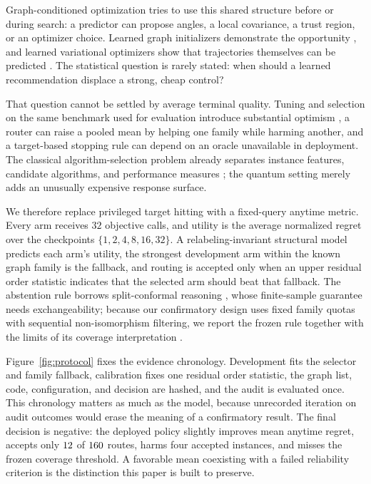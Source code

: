 \documentclass[10pt,twocolumn]{article}
\newcounter{algorithm}
\begin{document}
Graph-conditioned optimization tries to use this shared structure before or
during search: a predictor can propose angles, a local covariance, a trust
region, or an optimizer choice.  Learned graph initializers demonstrate the
opportunity \citep{jain2022gnn}, and learned variational optimizers show that
trajectories themselves can be predicted \citep{khairy2020learning}.  The
statistical question is rarely stated: when should a learned recommendation
displace a strong, cheap control?

That question cannot be settled by average terminal quality.  Tuning and
selection on the same benchmark used for evaluation introduce substantial
optimism \citep{cawley2010overfitting}, a router can raise a pooled mean by
helping one family while harming another, and a target-based stopping rule can
depend on an oracle unavailable in deployment.  The classical algorithm-selection
problem already separates instance features, candidate algorithms, and
performance measures \citep{rice1976selection}; the quantum setting merely adds
an unusually expensive response surface.

We therefore replace privileged target hitting with a fixed-query anytime
metric.  Every arm receives $32$ objective calls, and utility is the average
normalized regret over the checkpoints $\{1,2,4,8,16,32\}$.  A
relabeling-invariant structural model predicts each arm's utility, the strongest
development arm within the known graph family is the fallback, and routing is
accepted only when an upper residual order statistic indicates that the selected
arm should beat that fallback.  The abstention rule borrows split-conformal
reasoning \citep{vovk2005algorithmic,angelopoulos2021gentle}, whose finite-sample
guarantee needs exchangeability; because our confirmatory design uses fixed
family quotas with sequential non-isomorphism filtering, we report the frozen
rule together with the limits of its coverage interpretation
\citep{barber2022exchangeability}.

Figure~\ref{fig:protocol} fixes the evidence chronology.  Development fits the
selector and family fallback, calibration fixes one residual order statistic, the
graph list, code, configuration, and decision are hashed, and the audit is
evaluated once.  This chronology matters as much as the model, because
unrecorded iteration on audit outcomes would erase the meaning of a confirmatory
result.  The final decision is negative: the deployed policy slightly improves
mean anytime regret, accepts only $12$ of $160$ routes,
harms four accepted instances, and misses the frozen coverage threshold.  A
favorable mean coexisting with a failed reliability criterion is the distinction
this paper is built to preserve.
\end{document}
